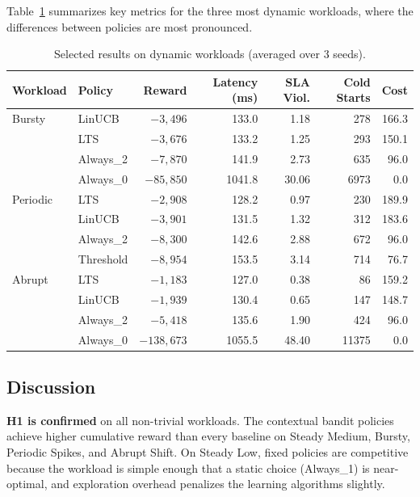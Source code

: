 \documentclass[11pt]{article}
\begin{document}
Table~\ref{tab:results} summarizes key metrics for the three most dynamic workloads, where the differences between policies are most pronounced.

\begin{table}[H]
\centering
\caption{Selected results on dynamic workloads (averaged over 3 seeds).}
\label{tab:results}
\small
\begin{tabular}{@{}llrrrrr@{}}
\toprule
\textbf{Workload} & \textbf{Policy} & \textbf{Reward} & \textbf{Latency (ms)} & \textbf{SLA Viol.} & \textbf{Cold Starts} & \textbf{Cost} \\
\midrule
Bursty     & LinUCB     & $-3{,}496$   & 133.0 & 1.18  & 278   & 166.3 \\
           & LTS        & $-3{,}676$   & 133.2 & 1.25  & 293   & 150.1 \\
           & Always\_2  & $-7{,}870$   & 141.9 & 2.73  & 635   & 96.0  \\
           & Always\_0  & $-85{,}850$  & 1041.8 & 30.06 & 6973 & 0.0   \\
\midrule
Periodic   & LTS        & $-2{,}908$   & 128.2 & 0.97  & 230   & 189.9 \\
           & LinUCB     & $-3{,}901$   & 131.5 & 1.32  & 312   & 183.6 \\
           & Always\_2  & $-8{,}300$   & 142.6 & 2.88  & 672   & 96.0  \\
           & Threshold  & $-8{,}954$   & 153.5 & 3.14  & 714   & 76.7  \\
\midrule
Abrupt     & LTS        & $-1{,}183$   & 127.0 & 0.38  & 86    & 159.2 \\
           & LinUCB     & $-1{,}939$   & 130.4 & 0.65  & 147   & 148.7 \\
           & Always\_2  & $-5{,}418$   & 135.6 & 1.90  & 424   & 96.0  \\
           & Always\_0  & $-138{,}673$ & 1055.5 & 48.40 & 11375 & 0.0  \\
\bottomrule
\end{tabular}
\end{table}

\subsection{Discussion}

\textbf{H1 is confirmed} on all non-trivial workloads. The contextual bandit policies achieve higher cumulative reward than every baseline on Steady Medium, Bursty, Periodic Spikes, and Abrupt Shift. On Steady Low, fixed policies are competitive because the workload is simple enough that a static choice (Always\_1) is near-optimal, and exploration overhead penalizes the learning algorithms slightly.
\end{document}
